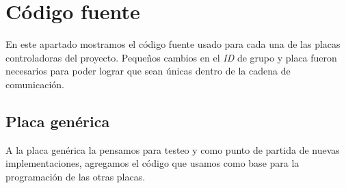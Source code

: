 \section{C\'odigo fuente}
\label{hA_source}

En este apartado mostramos el c\'odigo fuente usado para cada una de las placas controladoras
del proyecto.
Peque\~nos cambios en el \emph{ID} de grupo y placa fueron necesarios para poder lograr que sean
\'unicas dentro de la cadena de comunicaci\'on.

\subsection{Placa gen\'erica}
\label{hA_source_gen}

A la placa gen\'erica la pensamos para testeo y como punto de partida de nuevas
implementaciones, agregamos el c\'odigo que usamos como base para la programaci\'on de las otras
placas.

